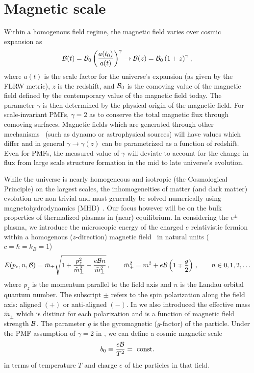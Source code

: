 \documentclass[a4paper]{article}
\begin{document}
\section{Magnetic scale}
\noindent Within a homogenous field regime, the magnetic field varies over cosmic expansion as
\begin{align}
    \label{cosmicscale}
    {\cal B}(t)={\cal B}_{0}\left(\frac{a(t_0)}{a(t)}\right)^{\gamma}\rightarrow{\cal B}(z)={\cal B}_{0}\left(1+z\right)^{\gamma}\,,
\end{align}
where $a(t)$ is the scale factor for the universe's expansion (as given by the FLRW metric), $z$ is the redshift, and ${\cal B}_{0}$ is the comoving value of the magnetic field defined by the contemporary value of the magnetic field today. The parameter $\gamma$ is then determined by the physical origin of the magnetic field. For scale-invariant PMFs, $\gamma=2$ as to conserve the total magnetic flux through comoving surfaces. Magnetic fields which are generated through other mechanisms~\cite{pomakov2022redshift} (such as dynamo or astrophysical sources) will have values which differ and in general $\gamma\rightarrow\gamma(z)$ can be parametrized as a function of redshift. Even for PMFs, the measured value of $\gamma$ will deviate to account for the change in flux from large scale structure formation in the mid to late universe's evolution.

While the universe is nearly homogeneous and isotropic (the Cosmological Principle) on the largest scales, the inhomogeneities of matter (and dark matter) evolution are non-trivial and must generally be solved numerically using magnetohydrodynamics (MHD)~\cite{melrose2008quantum,vazza2017simulations}. Our focus however will be on the bulk properties of thermalized plasmas in (near) equilibrium. In considering the $e^{\pm}$ plasma, we introduce the microscopic energy of the charged $e$ relativistic fermion within a homogenous ($z$-direction) magnetic field~\cite{steinmetz2018magnetic} in natural units ($c=\hbar=k_{B}=1$)
\begin{align}
    \label{eigenenergy}
    E(p_{z},n,{\cal B})={\tilde m}_{\pm}\sqrt{1+\frac{p_{z}^{2}}{{\tilde m}_{\pm}^{2}}+\frac{e{\cal B}n}{{\tilde m}_{\pm}^{2}}}\,,\qquad {\tilde m}_{\pm}^{2}=m^{2}+e{\cal B}\left(1\mp\frac{g}{2}\right)\,,\qquad n\in0,1,2,\ldots
\end{align}
where $p_{z}$ is the momentum parallel to the field axis and $n$ is the Landau orbital quantum number. The subscript $\pm$ refers to the spin polarization along the field axis: aligned $(+)$ or anti-aligned $(-)$. In  we also introduced the effective mass ${\tilde m}_{\pm}$ which is distinct for each polarization and is a function of magnetic field strength ${\cal B}$. The parameter $g$ is the gyromagnetic ($g$-factor) of the particle. Under the PMF assumption of $\gamma=2$ in , we can define a cosmic magnetic scale
\begin{align}
    b_{0}\equiv\frac{e{\cal B}}{T^{2}}={\rm\ const.}
\end{align}
in terms of temperature $T$ and charge $e$ of the particles in that field.
\end{document}
